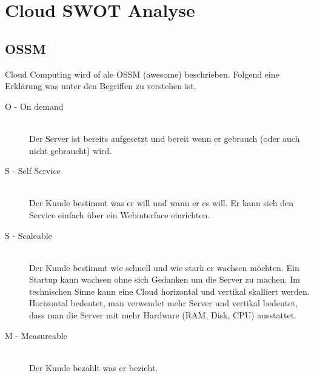 

\newcommand{\SUBJECT}{Report}
\newcommand{\TITLE}{Cloud Infrastructre Lab 5}



\section{Cloud SWOT Analyse}

\subsection{OSSM}
Cloud Computing wird of ale OSSM (awesome) beschrieben. Folgend eine Erklärung was unter den Begriffen zu verstehen ist.
\begin{description}
	\item[O - On demand ] \hfill \\
	Der Server ist bereits aufgesetzt und bereit wenn er gebrauch (oder auch nicht gebraucht) wird.
	\item[S - Self Service] \hfill \\
	Der Kunde bestimmt was er will und wann er es will. Er kann sich den Service einfach über ein Webinterface einrichten.
	\item[S - Scaleable] \hfill \\
	Der Kunde bestimmt wie schnell und wie stark er wachsen möchten. Ein Startup kann wachsen ohne sich Gedanken um die Server zu machen. Im technischen Sinne kann eine Cloud horizontal und vertikal skalliert werden. Horizontal bedeutet, man verwendet mehr Server und vertikal bedeutet, dass man die Server mit mehr Hardware (RAM, Disk, CPU) ausstattet.
	\item[M - Measureable] \hfill \\
	Der Kunde bezahlt was er bezieht. 
\end{description}

